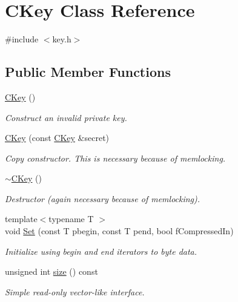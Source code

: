 \hypertarget{class_c_key}{}\section{C\+Key Class Reference}
\label{class_c_key}


{\ttfamily \#include $<$key.\+h$>$}

\subsection*{Public Member Functions}
\begin{DoxyCompactItemize}
\item 
\mbox{\hyperlink{class_c_key_a8f4ca910c7b7e729a3f2a5c59d060d3d}{C\+Key}} ()
\begin{DoxyCompactList}\small\item\em Construct an invalid private key. \end{DoxyCompactList}\item 
\mbox{\hyperlink{class_c_key_afcea34cefd25675f4cf9b03eaa4bb7d9}{C\+Key}} (const \mbox{\hyperlink{class_c_key}{C\+Key}} \&secret)
\begin{DoxyCompactList}\small\item\em Copy constructor. This is necessary because of memlocking. \end{DoxyCompactList}\item 
\mbox{\hyperlink{class_c_key_a57d5b254748cef054c40f99c1c339147}{$\sim$\+C\+Key}} ()
\begin{DoxyCompactList}\small\item\em Destructor (again necessary because of memlocking). \end{DoxyCompactList}\item 
{\footnotesize template$<$typename T $>$ }\\void \mbox{\hyperlink{class_c_key_aaa13d5f08456bba094210c5eeabf64c8}{Set}} (const T pbegin, const T pend, bool f\+Compressed\+In)
\begin{DoxyCompactList}\small\item\em Initialize using begin and end iterators to byte data. \end{DoxyCompactList}\item 
unsigned int \mbox{\hyperlink{class_c_key_a468a9a8cd148ab4a43e7d76bbdc78abe}{size}} () const
\begin{DoxyCompactList}\small\item\em Simple read-\/only vector-\/like interface. \end{DoxyCompactList}\item 

\end{DoxyCompactItemize}
